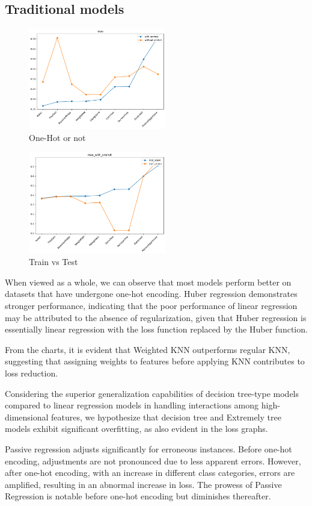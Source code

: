 \documentclass[twocolumn]{article}
\begin{document}
	\subsection{Traditional models}
		\begin{figure}[H]
		\centering
		\includegraphics[width=6cm]{tradition_mae.png} 
		\caption{One-Hot or not} 
		\label{Fig.tradition_mae} 
		\end{figure}
		\begin{figure}[H]
		\centering
		\includegraphics[width=6cm]{tradition_loss.png} 
		\caption{Train vs Test} 
		\label{Fig.svm_loss} 
		\end{figure}
When viewed as a whole, we can observe that most models perform better on datasets that have undergone one-hot encoding. Huber regression demonstrates stronger performance, indicating that the poor performance of linear regression may be attributed to the absence of regularization, given that Huber regression is essentially linear regression with the loss function replaced by the Huber function.

From the charts, it is evident that Weighted KNN outperforms regular KNN, suggesting that assigning weights to features before applying KNN contributes to loss reduction.

Considering the superior generalization capabilities of decision tree-type models compared to linear regression models in handling interactions among high-dimensional features, we hypothesize that decision tree and Extremely tree models exhibit significant overfitting, as also evident in the loss graphs.

Passive regression adjusts significantly for erroneous instances. Before one-hot encoding, adjustments are not pronounced due to less apparent errors. However, after one-hot encoding, with an increase in different class categories, errors are amplified, resulting in an abnormal increase in loss. The prowess of Passive Regression is notable before one-hot encoding but diminishes thereafter.
\end{document}
